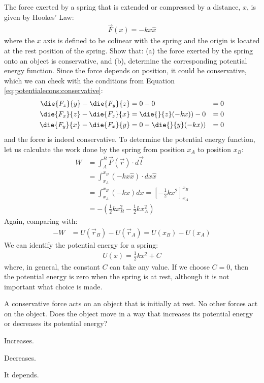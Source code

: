 \begin{example}{\label{ex:potentialecons:springpotential}The force exerted by a spring that is extended or compressed by a distance, $x$, is given by Hookes' Law:
\begin{align*}
\vec F(x) = -k x\hat x
\end{align*}
where the $x$ axis is defined to be colinear with the spring and the origin is located at the rest position of the spring. Show that: (a) the force exerted by the spring onto an object is conservative, and (b), determine the corresponding potential energy function. }
Since the force depends on position, it could be conservative, which we can check with the conditions from Equation \ref{eq:potentialecons:conservative}:
\begin{align*}
\die{F_z}{y}-\die{F_y}{z} &= 0 - 0 &= 0\\
\die{F_x}{z}-\die{F_z}{x} &= \die{}{z}(-kx)) - 0&= 0\\
\die{F_y}{x}-\die{F_x}{y} &= 0 - \die{}{y}(-kx)) &=0
\end{align*}
and the force is indeed conservative. To determine the potential energy function, let us calculate the work done by the spring from position $x_A$ to position $x_B$:
\begin{align*}
W &=\int_A^B \vec F(\vec r) \cdot d\vec l\\
&=\int_{x_A}^{x_B} (-kx\hat x) \cdot dx \hat x\\
&=\int_{x_A}^{x_B} (-kx)dx=\left[-\frac{1}{2}kx^2  \right]_{x_A}^{x_B}\\
&=-\left( \frac{1}{2}kx_B^2-\frac{1}{2}kx_A^2 \right)
\end{align*}
Again, comparing with:
\begin{align*}
-W &= U(\vec r_B) - U(\vec r_A) = U(x_B) - U(x_A)
\end{align*}
We can identify the potential energy for a spring:
\begin{align*}
U(x) = \frac{1}{2}kx^2 + C
\end{align*}
where, in general, the constant $C$ can take any value. If we choose $C=0$, then the potential energy is zero when the spring is at rest, although it is not important what choice is made.
\end{example}

\begin{checkpoint}
\begin{MCquestion}{A conservative force acts on an object that is initially at rest. No other forces act on the object. Does the object move in a way that increases its potential energy or decreases its potential energy?}
\item Increases.
\item Decreases. \correct
\item It depends.
\end{MCquestion}
\end{checkpoint}


